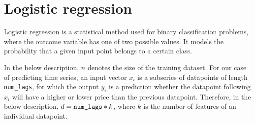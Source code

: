 
















\section{Logistic regression}

Logistic regression \cite{logistic_regression} is a statistical method used for binary classification problems, where the outcome variable has one of two possible values. It models the probability that a given input point belongs to a certain class.

In the below description, \(n\) denotes the size of the training dataset. For our case of predicting time series, an input vector \(x_i\) is a subseries of datapoints of length \verb|num_lags|, for which the output \(y_i\) is a prediction whether the datapoint following \(x_i\) will have a higher or lower price than the previous datapoint. Therefore, in the below description, \(d = \verb|num_lags|*k\), where \(k\) is the number of features of an individual datapoint.

